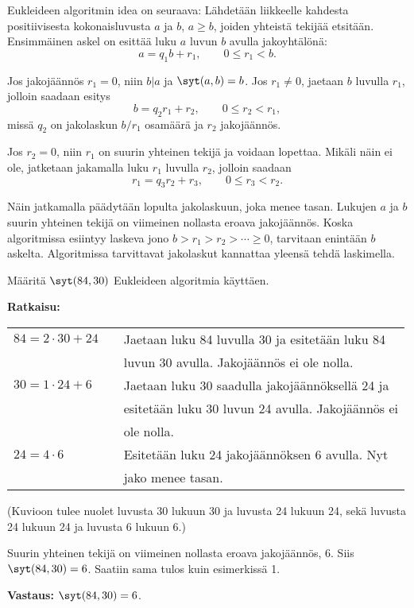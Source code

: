

Eukleideen algoritmin idea on seuraava: Lähdetään liikkeelle kahdesta positiivisesta kokonaisluvusta $a$ ja $b$, $a\ge b$, joiden yhteistä tekijää etsitään. Ensimmäinen askel on esittää luku $a$ luvun $b$ avulla jakoyhtälönä:
\[
a=q_1b + r_1, \qquad 0 \le r_1 < b.
\]

Jos jakojäännös $r_1=0$, niin $b|a$ ja $\syt(a, b)=b$. Jos $r_1\neq 0$, jaetaan $b$ luvulla $r_1$, jolloin saadaan esitys
\[
b= q_2r_1+r_2, \qquad 0 \le r_2 < r_1,
\]
missä $q_2$ on jakolaskun $b/r_1$ osamäärä ja $r_2$ jakojäännös.

Jos $r_2=0$, niin $r_1$ on suurin yhteinen tekijä ja voidaan lopettaa. Mikäli näin ei ole, jatketaan jakamalla luku $r_1$ luvulla $r_2$, jolloin saadaan
\[
r_1 = q_3r_2 + r_3, \qquad 0 \le r_3 < r_2.
\]

Näin jatkamalla päädytään lopulta jakolaskuun, joka menee tasan. Lukujen $a$ ja $b$ suurin yhteinen tekijä on viimeinen nollasta eroava jakojäännös. Koska algoritmissa esiintyy laskeva jono $b>r_1>r_2> \cdots \ge 0$, tarvitaan enintään $b$ askelta. Algoritmissa tarvittavat jakolaskut kannattaa yleensä tehdä laskimella.

\begin{esimerkki}
Määritä $\syt(84, 30)$ Eukleideen
algoritmia käyttäen.

{\bf Ratkaisu:}

\begin{tabular}{lcl}
$84 = 2 \cdot 30 + 24$ & &
Jaetaan luku 84 luvulla 30 ja esitetään luku 84 \\
&& luvun 30 avulla. Jakojäännös ei ole nolla.\\
$30 = 1 \cdot 24 + 6$ & & Jaetaan luku 30 saadulla
jakojäännöksellä 24 ja \\
&& esitetään luku 30 luvun 24 avulla. Jakojäännös ei \\
&& ole nolla. \\
$24 = 4 \cdot 6$ & & Esitetään luku 24 jakojäännöksen 6
avulla. Nyt \\
&& jako menee tasan.
\end{tabular}

(Kuvioon tulee nuolet luvusta 30 lukuun 30 ja luvusta 24
lukuun 24, sekä luvusta 24
lukuun 24 ja luvusta 6 lukuun 6.)

Suurin yhteinen tekijä on viimeinen nollasta eroava
jakojäännös, $6$. Siis $\syt(84, 30) = 6$. Saatiin sama
tulos kuin esimerkissä 1.

{\bf Vastaus:} $\syt(84, 30) = 6$.
\end{esimerkki}

